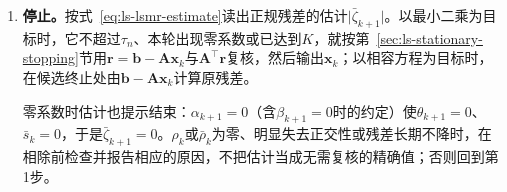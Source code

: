 \begin{enumerate}
 第二层先用$\bar{\bm G}_1$把$(0,\rho_2)$变成$(\bar\theta_2,\bar c_1\rho_2)\approx(0.3610,1.0228)$；新列下方的$\theta_3=0$，本轮旋转是恒等变换，$\bar c_2=1$，$\bar s_2=0$：
 \[
  \begin{bmatrix}1.0228&-0.7442\\0&0\end{bmatrix}
  \xrightarrow{\ \bar{\bm G}_2\ }
  \begin{bmatrix}1.0228&-0.7442\\0&0\end{bmatrix},
 \]
 即
 \[
  \bar\rho_2=\frac{2\sqrt{17}}{\sqrt{65}},\qquad \zeta_2=-\frac6{\sqrt{65}},\qquad \bar\zeta_3=0 .
 \]

 两层方向为
 \[
  \begin{gathered}
  \bm w_2=\frac{\bm v_2-\theta_2\bm w_1}{\rho_2}=\frac{1}{\sqrt{17}}\begin{bmatrix}-4\\1/2\end{bmatrix},\\
  \bar{\bm w}_2=\frac{\bm w_2-\bar\theta_2\bar{\bm w}_1}{\bar\rho_2}=\frac1{\sqrt{65}}\begin{bmatrix}-8\\1/4\end{bmatrix},
  \end{gathered}
 \]
 于是
 \[
  \bm x_2=\bm x_1+\zeta_2\bar{\bm w}_2
  =\frac{17}{65}\begin{bmatrix}1\\2\end{bmatrix}+\frac{6}{65}\begin{bmatrix}8\\-1/4\end{bmatrix}
  =\begin{bmatrix}1\\1/2\end{bmatrix}.
 \]

 \item \textbf{停止。}按式~\eqref{eq:ls-lsmr-estimate}读出正规残差的估计$\lvert\bar\zeta_{k+1}\rvert$。以最小二乘为目标时，它不超过$\tau_n$、本轮出现零系数或已达到$K$，就按第~\ref{sec:ls-stationary-stopping}节用$\bm r=\bm b-\bm A\bm x_k$与$\bm A^\top\bm r$复核，然后输出$\bm x_k$；以相容方程为目标时，在候选终止处由$\bm b-\bm A\bm x_k$计算原残差。

 零系数时估计也提示结束：$\alpha_{k+1}=0$（含$\beta_{k+1}=0$时的约定）使$\theta_{k+1}=0$、$\bar s_k=0$，于是$\bar\zeta_{k+1}=0$。$\rho_k$或$\bar\rho_k$为零、明显失去正交性或残差长期不降时，在相除前检查并报告相应的原因，不把估计当成无需复核的精确值；否则回到第1步。


\end{enumerate}
